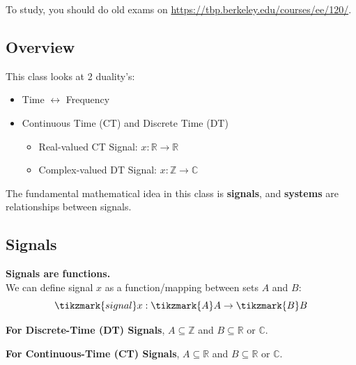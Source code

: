 To study, you should do old exams on \url{https://tbp.berkeley.edu/courses/ee/120/}.


\newpage
\subsection{Overview}
This class looks at 2 duality's:
\begin{itemize}
    \item Time $\leftrightarrow$ Frequency
    \item Continuous Time (CT) and Discrete Time (DT)
    \begin{itemize}
        \item Real-valued CT Signal: $x: \mathbb{R}\to\mathbb{R}$
        \item Complex-valued DT Signal: $x: \mathbb{Z}\to\mathbb{C}$
    \end{itemize}
\end{itemize}
The fundamental mathematical idea in this class is \textbf{signals}, and \textbf{systems} are relationships between signals.

\subsection{Signals}

\textbf{Signals are functions.}
\\
We can define signal $x$ as a function/mapping between sets $A$ and $B$: \\
\[
\tikzmark{signal}x: \tikzmark{A}A \to \tikzmark{B}B
\] 

\textbf{For Discrete-Time (DT) Signals}, $A \subseteq \mathbb{Z}$ and $B \subseteq \mathbb{R} \text{ or } \mathbb{C}$.

\textbf{For Continuous-Time (CT) Signals}, $A \subseteq \mathbb{R}$ and $B \subseteq \mathbb{R} \text{ or } \mathbb{C}$.

